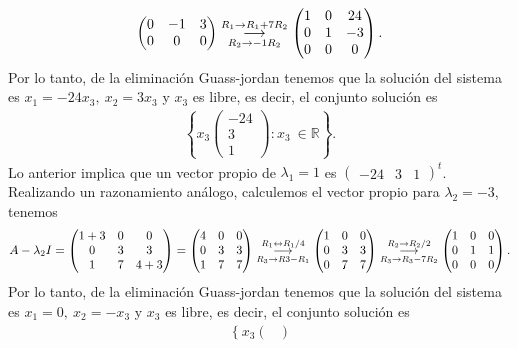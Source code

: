 \documentclass[11pt,letterpaper]{article}
\newcommand{\mR}{\mathbb{R}}
\newcommand{\grstep}[2][\relax]{%
   \ensuremath{\mathrel{
       {\mathop{\longrightarrow}\limits^{#2\mathstrut}_{
                                     \begin{subarray}{l} #1 \end{subarray}}}}}}
\begin{document}
\begin{enumerate}
\begin{align*}
\begin{pmatrix}
0 & -1 &3\\
0& 0 & 0
\end{pmatrix}
%
\grstep[R_2\rightarrow -1R_2]{R_1 \rightarrow R_1+7R_2}
%
\begin{pmatrix}
1 & 0 &24\\
0 & 1 &-3\\
0& 0 & 0
\end{pmatrix}.
\end{align*}
Por lo tanto, de la eliminación Guass-jordan tenemos que la solución del sistema es $x_1=-24x_3, \ x_2=3x_3$ y $x_3$ es libre, es decir, el conjunto solución es
\begin{align*}
\left\{x_3\begin{pmatrix}
-24\\
3\\
1
\end{pmatrix}: x_3 \ \in \mR \right\}.
\end{align*}
Lo anterior implica que un vector propio de $\lambda_1=1$ es 
$\begin{pmatrix}
-24 & 3 & 1
\end{pmatrix}^t$. Realizando un razonamiento análogo, calculemos el vector propio para $\lambda_2=-3$, tenemos 
\begin{align*}
A-\lambda_2I=\begin{pmatrix}
1+3& 0 & 0\\
0 & 3 &3\\
1 & 7 & 4+3
\end{pmatrix}=\begin{pmatrix}
4& 0 & 0\\
0 & 3 &3\\
1 & 7 & 7
\end{pmatrix}%
\grstep[R_3\rightarrow R3-R_1]{R_1 \leftrightarrow R_1/4}
%
\begin{pmatrix}
1 & 0 & 0\\
0 & 3 &3\\
0& 7 & 7
\end{pmatrix}
%
\grstep[R_3\rightarrow R_3-7R_2]{R_2 \rightarrow R_2/2}
%
\begin{pmatrix}
1 & 0 &0\\
0 & 1 &1\\
0& 0 & 0
\end{pmatrix}.
\end{align*}
Por lo tanto, de la eliminación Guass-jordan tenemos que la solución del sistema es $x_1=0,\ x_2=-x_3$ y $x_3$ es libre, es decir, el conjunto solución es
\begin{align*}
\left\{x_3\begin{pmatrix}

\end{pmatrix}
\end{align*}
\end{enumerate}
\end{document}
